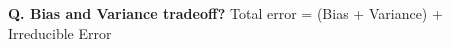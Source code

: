 \begin{frame}[fragile]{\textbf{Q. Bias and Variance tradeoff?}}
  Total error = (Bias + Variance) + Irreducible Error
  \begin{columns}[T]
  \begin{column}{.58\textwidth}
\end{column}
\end{columns}
\end{frame}
